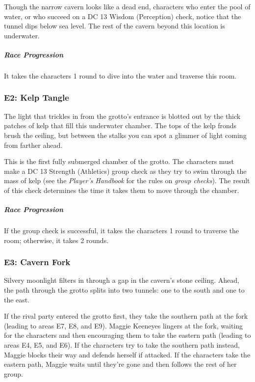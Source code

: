 \documentclass[10pt,a4paper,twoside,fancy,bg=print,twocolumn,openany,nodeprecatedcode]{dndbook}
\begin{document}
Though the narrow cavern looks like a dead end, characters who enter the pool of water, or who succeed on a DC 13 Wisdom (Perception) check, notice that the tunnel dips below sea level. The rest of the cavern beyond this location is underwater.

\subparagraph{Race Progression}
It takes the characters 1 round to dive into the water and traverse this room.

\subsubsection{E2: Kelp Tangle}
\begin{DndReadAloud}{}
The light that trickles in from the grotto's entrance is blotted out by the thick patches of kelp that fill this underwater chamber. The tops of the kelp fronds brush the ceiling, but between the stalks you can spot a glimmer of light coming from farther ahead.

\end{DndReadAloud}

This is the first fully submerged chamber of the grotto. The characters must make a DC 13 Strength (Athletics) group check as they try to swim through the mass of kelp (see the \textit{Player's Handbook} for the rules on \textit{group checks}). The result of this check determines the time it takes them to move through the chamber.

\subparagraph{Race Progression}
If the group check is successful, it takes the characters 1 round to traverse the room; otherwise, it takes 2 rounds.

\subsubsection{E3: Cavern Fork}
\begin{DndReadAloud}{}
Silvery moonlight filters in through a gap in the cavern's stone ceiling. Ahead, the path through the grotto splits into two tunnels: one to the south and one to the east.

\end{DndReadAloud}

If the rival party entered the grotto first, they take the southern path at the fork (leading to areas E7, E8, and E9). Maggie Keeneyes lingers at the fork, waiting for the characters and then encouraging them to take the eastern path (leading to areas E4, E5, and E6). If the characters try to take the southern path instead, Maggie blocks their way and defends herself if attacked. If the characters take the eastern path, Maggie waits until they're gone and then follows the rest of her group.
\end{document}

